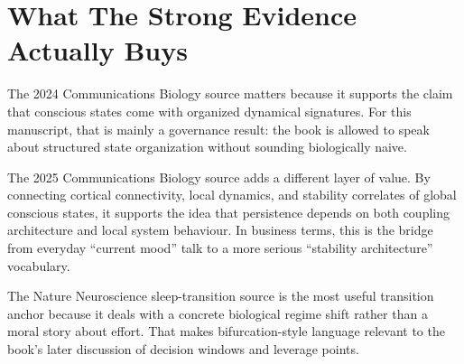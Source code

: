 \section{What The Strong Evidence Actually Buys}

The 2024 Communications Biology source matters because it supports the claim
that conscious states come with organized dynamical signatures. For this
manuscript, that is mainly a governance result: the book is allowed to speak
about structured state organization without sounding biologically naive.

The 2025 Communications Biology source adds a different layer of value. By
connecting cortical connectivity, local dynamics, and stability correlates of
global conscious states, it supports the idea that persistence depends on both
coupling architecture and local system behaviour. In business terms, this is
the bridge from everyday ``current mood'' talk to a more serious ``stability
architecture'' vocabulary.

The Nature Neuroscience sleep-transition source is the most useful transition
anchor because it deals with a concrete biological regime shift rather than a
moral story about effort. That makes bifurcation-style language relevant to the
book's later discussion of decision windows and leverage points.
